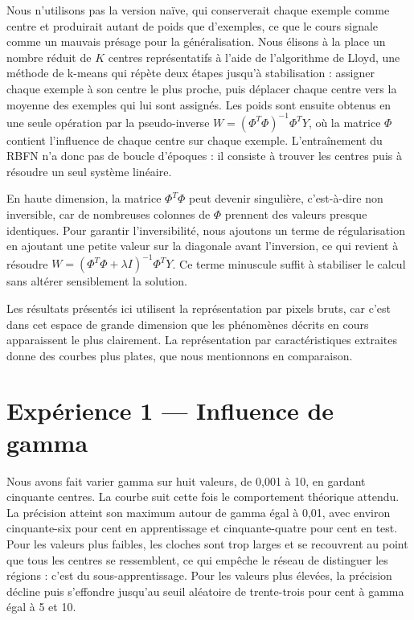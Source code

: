\documentclass[11pt,a4paper]{report}
\begin{document}
Nous n'utilisons pas la version naïve, qui conserverait chaque exemple
comme centre et produirait autant de poids que d'exemples, ce que le
cours signale comme un mauvais présage pour la généralisation. Nous
élisons à la place un nombre réduit de \(K\) centres représentatifs à
l'aide de l'algorithme de Lloyd, une méthode de k-means qui répète deux
étapes jusqu'à stabilisation : assigner chaque exemple à son centre le
plus proche, puis déplacer chaque centre vers la moyenne des exemples
qui lui sont assignés. Les poids sont ensuite obtenus en une seule
opération par la pseudo-inverse \(W = (\Phi^T\Phi)^{-1}\Phi^T Y\), où la
matrice \(\Phi\) contient l'influence de chaque centre sur chaque
exemple. L'entraînement du RBFN n'a donc pas de boucle d'époques : il
consiste à trouver les centres puis à résoudre un seul système linéaire.

En haute dimension, la matrice \(\Phi^T\Phi\) peut devenir singulière,
c'est-à-dire non inversible, car de nombreuses colonnes de \(\Phi\)
prennent des valeurs presque identiques. Pour garantir l'inversibilité,
nous ajoutons un terme de régularisation en ajoutant une petite valeur
sur la diagonale avant l'inversion, ce qui revient à résoudre
\(W = (\Phi^T\Phi + \lambda I)^{-1}\Phi^T Y\). Ce terme minuscule suffit
à stabiliser le calcul sans altérer sensiblement la solution.

Les résultats présentés ici utilisent la représentation par pixels
bruts, car c'est dans cet espace de grande dimension que les phénomènes
décrits en cours apparaissent le plus clairement. La représentation par
caractéristiques extraites donne des courbes plus plates, que nous
mentionnons en comparaison.

\hypertarget{expuxe9rience-1-influence-de-gamma}{%
\section{Expérience 1 --- Influence de
gamma}\label{expuxe9rience-1-influence-de-gamma}}

Nous avons fait varier gamma sur huit valeurs, de 0,001 à 10, en gardant
cinquante centres. La courbe suit cette fois le comportement théorique
attendu. La précision atteint son maximum autour de gamma égal à 0,01,
avec environ cinquante-six pour cent en apprentissage et
cinquante-quatre pour cent en test. Pour les valeurs plus faibles, les
cloches sont trop larges et se recouvrent au point que tous les centres
se ressemblent, ce qui empêche le réseau de distinguer les régions :
c'est du sous-apprentissage. Pour les valeurs plus élevées, la précision
décline puis s'effondre jusqu'au seuil aléatoire de trente-trois pour
cent à gamma égal à 5 et 10.
\end{document}
